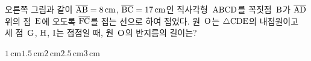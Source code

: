 \noindent\begin{minipage}[t]{0.58\linewidth}\vspace{0pt}\raggedright 오른쪽 그림과 같이 $\overline{\mathrm{AB}}=8\,\mathrm{cm}$, $\overline{\mathrm{BC}}=17\,\mathrm{cm}$인 직사각형~$\mathrm{ABCD}$를 꼭짓점~$\mathrm{B}$가 $\overline{\mathrm{AD}}$ 위의 점~$\mathrm{E}$에 오도록 $\overline{\mathrm{FC}}$를 접는 선으로 하여 접었다. 원~$\mathrm{O}$는 $\triangle\mathrm{CDE}$의 내접원이고 세 점~$\mathrm{G}$, $\mathrm{H}$, $\mathrm{I}$는 접점일 때, 원~$\mathrm{O}$의 반지름의 길이는?\end{minipage}\hfill\begin{minipage}[t]{0.4\linewidth}\vspace{0pt}\centering \resizebox{\ifdim\width>\linewidth\linewidth\else\width\fi}{!}{}\end{minipage}\par
\begin{choices32}{$1\,\mathrm{cm}$}{$1.5\,\mathrm{cm}$}{$2\,\mathrm{cm}$}{$2.5\,\mathrm{cm}$}{$3\,\mathrm{cm}$}\end{choices32}
